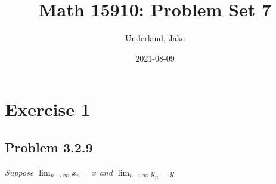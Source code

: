\documentclass[
]{article}
\title{Math 15910: Problem Set 7}
\author{Underland, Jake}
\date{2021-08-09}
\begin{document}
\maketitle

{
\setcounter{tocdepth}{2}
\tableofcontents
}
\hypertarget{exercise-1}{%
\section{Exercise 1}\label{exercise-1}}

\hypertarget{problem-3.2.9}{%
\subsection{Problem 3.2.9}\label{problem-3.2.9}}

\textit{Suppose $\lim _{n \to \infty} x_n = x $ and $\lim _{n \to \infty} y_n = y $}
\end{document}
